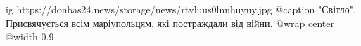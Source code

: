  
 
 
 
 

\ifcmt
  ig https://donbas24.news/storage/news/rtvluus0lnnhuyuy.jpg
	@caption "Світло". Присвячується всім маріупольцям, які постраждали від війни.
  @wrap center
  @width 0.9
\fi
